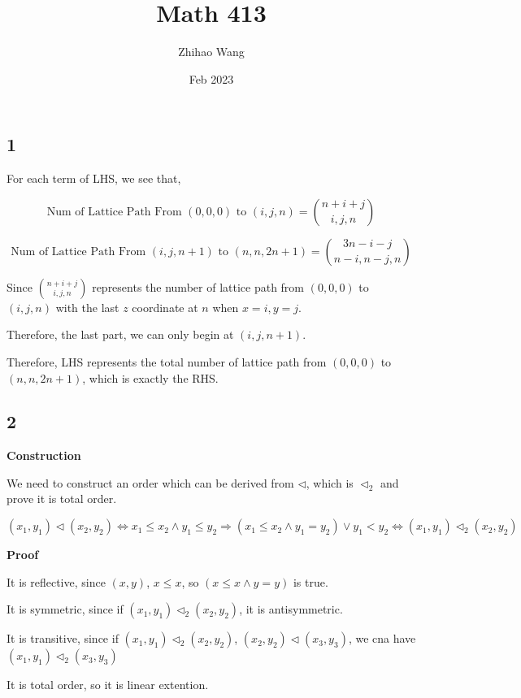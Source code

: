 \documentclass{article}
\title{Math 413}
\author{Zhihao Wang}
\date{Feb 2023}
\def\implies{\Longrightarrow}
\begin{document}
\maketitle

\subsection*{1}

For each term of LHS, we see that,

$$\text{Num of Lattice Path From $(0, 0, 0)$ to $(i, j, n )$} = {n + i + j \choose i, j , n}$$

$$\text{Num of Lattice Path From $(i, j, n + 1)$ to $(n, n , 2n + 1)$} = {3n - i - j \choose n-i, n-j , n}$$

Since ${n + i + j \choose i, j , n}$ represents the number of lattice path from $(0,0,0)$ to $(i, j, n )$ with the last $z$ coordinate at $n$ when $x=i,y=j$.

Therefore, the last part, we can only begin at $(i, j, n + 1)$.

Therefore, LHS represents the total number of lattice path from $(0,0,0)$ to $(n, n , 2n + 1)$, which is exactly the RHS.


\subsection*{2}

\textbf{Construction}

We need to construct an order which can be derived from $\lhd$, which is $\lhd_2$ and prove it is total order.

$$(x_1, y_1) \lhd (x_2, y_2) \iff x_1 \le x_2 \land y_1 \le y_2 \implies (x_1 \le x_2 \land y_1 = y_2 ) \lor y_1 < y_2 \iff (x_1, y_1) \lhd_2 (x_2, y_2)$$

\textbf{Proof}

It is reflective, since $(x, y)$, $x \le x$, so  $(x \le x \land y = y )$ is true.

It is symmetric, since if $(x_1, y_1) \lhd_2 (x_2, y_2)$, it is antisymmetric. 

It is transitive, since if $(x_1, y_1) \lhd_2 (x_2, y_2)$, $(x_2, y_2) \lhd (x_3, y_3)$, we cna have $(x_1, y_1) \lhd_2 (x_3, y_3)$

It is total order, so it is linear extention.
\end{document}
